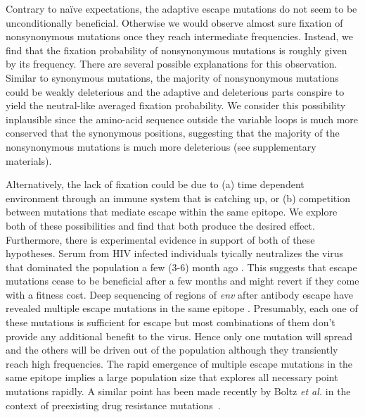 \documentclass[rmp, twocolumn]{revtex4}
\newcommand{\env}{\textit{env}}
\begin{document}
Contrary to na\"ive expectations, the adaptive escape mutations do not seem to be
unconditionally beneficial. Otherwise we would observe almost sure fixation of
nonsynonymous mutations once they reach intermediate frequencies. Instead, we
find that the fixation probability of nonsynonymous mutations is roughly given
by its frequency. There are several possible explanations for this observation. 
Similar to synonymous mutations, the majority of nonsynonymous mutations could
be weakly deleterious and the adaptive and deleterious parts conspire to yield
the neutral-like averaged fixation probability. We consider this possibility
inplausible since the amino-acid sequence outside the variable loops is much
more conserved that the synonymous positions, suggesting that the majority of
the nonsynonymous mutations is much more deleterious (see supplementary
materials). 

Alternatively, the lack of fixation could be due to (a) time dependent environment
through an immune system that is catching up, or (b) competition between mutations
that mediate escape within the same epitope. We explore both of these
possibilities and find that both produce the desired effect. Furthermore, there
is experimental evidence in support of both of these hypotheses. Serum from HIV infected
individuals tyically neutralizes the virus that dominated the population a few
(3-6) month ago \citep{richman_rapid_2003}. This suggests that escape mutations
cease to be beneficial after a few months and might revert if they come with a
fitness cost. Deep sequencing of regions of \env{} after antibody escape have
revealed multiple escape mutations in the same epitope
\citep{moore_limited_2009, bar_early_2012}. Presumably, each one of these
mutations is sufficient for escape but most combinations of them don't provide
any additional benefit to the virus. Hence only one mutation will spread and the
others will be driven out of the population although they transiently reach high
frequencies. The rapid emergence of multiple escape mutations in the same
epitope implies a large population size that explores all necessary point mutations rapidly. A
similar point has been made recently by Boltz {\it et al.} in the context of
preexisting drug resistance mutations~\citep{boltz_ultrasensitive_2012}. 
\end{document}
